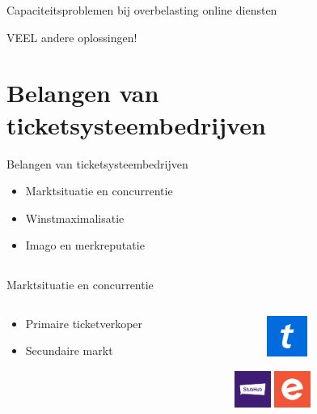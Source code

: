 \documentclass{beamer}
\begin{document}
\begin{frame}{Capaciteitsproblemen bij overbelasting online diensten}
    \begin{center}
        \alert{\Huge{VEEL andere oplossingen!}}
    \end{center}
\end{frame}


\section[Bedrijf]{Belangen van ticketsysteembedrijven}
\begin{frame}{Belangen van ticketsysteembedrijven}
    \begin{itemize}
        \item Marktsituatie en concurrentie
        \item Winstmaximalisatie
        \item Imago en merkreputatie
    \end{itemize}
\end{frame}

    \subsection{}
    \begin{frame}{Marktsituatie en concurrentie}
        \begin{columns}
            \begin{column}{.4\textwidth}
                \begin{itemize}
                    \item Primaire ticketverkoper
                    \item Secundaire markt
                \end{itemize}
            \end{column}
            \begin{column}{.6\textwidth}
                \begin{figure}
                    \includegraphics[width=50px,height=50px,keepaspectratio]{ticketmaster-logo.png}
                \end{figure}
                \centering
                \includegraphics[width=45px,height=45px,keepaspectratio]{stubhub-logo.png}
                \includegraphics[width=45px,height=45px,keepaspectratio]{eventbrite-logo.png}
            \end{column}
        \end{columns}
    \end{frame}
    
\end{document}
